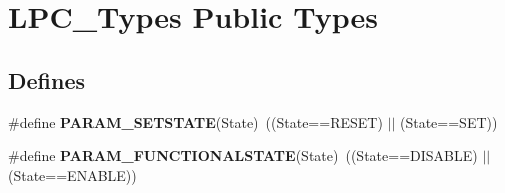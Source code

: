 \hypertarget{group___l_p_c___types___public___types}{\section{\-L\-P\-C\-\_\-\-Types \-Public \-Types}
\label{group___l_p_c___types___public___types}
}
\subsection*{\-Defines}
\begin{DoxyCompactItemize}
\item 
\hypertarget{group___l_p_c___types___public___types_gafb6827323e4c501477936a84bd733b4f}{\#define {\bfseries \-P\-A\-R\-A\-M\-\_\-\-S\-E\-T\-S\-T\-A\-T\-E}(\-State)~((\-State==\-R\-E\-S\-E\-T) $|$$|$ (\-State==\-S\-E\-T))}\label{group___l_p_c___types___public___types_gafb6827323e4c501477936a84bd733b4f}

\item 
\hypertarget{group___l_p_c___types___public___types_ga5475435ea985fe5abbf2048e87e3e682}{\#define {\bfseries \-P\-A\-R\-A\-M\-\_\-\-F\-U\-N\-C\-T\-I\-O\-N\-A\-L\-S\-T\-A\-T\-E}(\-State)~((\-State==\-D\-I\-S\-A\-B\-L\-E) $|$$|$ (\-State==\-E\-N\-A\-B\-L\-E))}\label{group___l_p_c___types___public___types_ga5475435ea985fe5abbf2048e87e3e682}

\end{DoxyCompactItemize}
